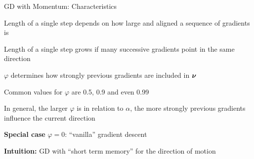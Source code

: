 \documentclass[11pt,compress,t,notes=noshow, xcolor=table]{beamer}
\begin{document}
\begin{framei}{GD with Momentum: Characteristics}
\item Length of a single step depends on how large and aligned a sequence of gradients is
\item Length of a single step grows if many successive gradients point in the same direction
\item $\varphi$ determines how strongly previous gradients are included in $\bm{\nu}$
\item Common values for $\varphi$ are 0.5, 0.9 and even 0.99
\item In general, the larger $\varphi$ is in relation to $\alpha$, the more strongly previous gradients influence the current direction
\item \textbf{Special case} $\varphi = 0$: ``vanilla'' gradient descent
\item \textbf{Intuition:} GD with ``short term memory'' for the direction of motion
\end{framei}
\end{document}
